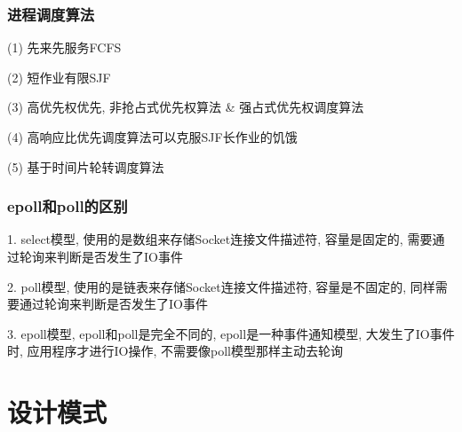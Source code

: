 \documentclass[UTF8]{ctexart}
\begin{document}
\subsubsection{进程调度算法}
(1) 先来先服务FCFS\par
(2) 短作业有限SJF \par
(3) 高优先权优先, 非抢占式优先权算法 \& 强占式优先权调度算法 \par
(4) 高响应比优先调度算法可以克服SJF长作业的饥饿 \par
(5) 基于时间片轮转调度算法 \par
\subsubsection{epoll和poll的区别}
1. select模型, 使用的是数组来存储Socket连接文件描述符, 容量是固定的, 需要通过轮询来判断是否发生了IO事件\par
2. poll模型, 使用的是链表来存储Socket连接文件描述符, 容量是不固定的, 同样需要通过轮询来判断是否发生了IO事件 \par
3. epoll模型, epoll和poll是完全不同的, epoll是一种事件通知模型, 大发生了IO事件时, 应用程序才进行IO操作, 不需要像poll模型那样主动去轮询 \par
\section{设计模式}
\end{document}
